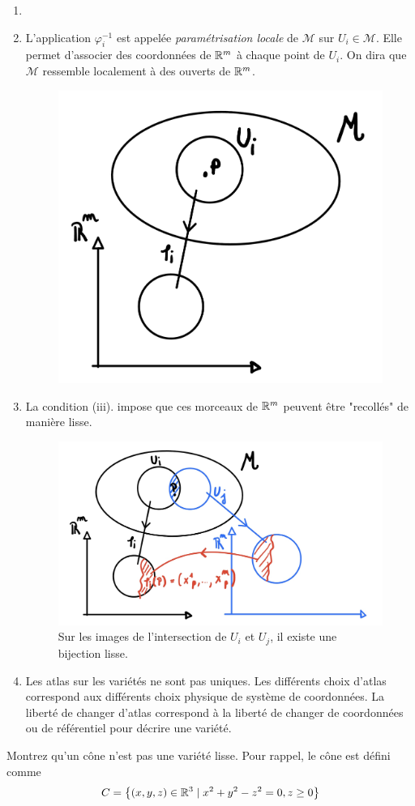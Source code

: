 \begin{rmk} 
    \begin{enumerate}
        \item[\,] 
        \item L'application $\varphi_i^{-1}$ est appelée \emph{paramétrisation locale} de $\mathcal{M}$ sur $U_i\in \mathcal{M}$. Elle permet d'associer des coordonnées de $\mathbb{R}^m$ à chaque point de $U_i$. On dira que $\mathcal{M}$ ressemble localement à des ouverts de $\mathbb{R}^m$.
        \begin{figure}[H]
            \centering
            \includegraphics[width=0.3\linewidth]{Chapitres/3.Element de géométrie différentielle/Images/variété.jpg}
            \caption{}
            \label{fig:3.1}
        \end{figure}
        \item La condition (iii). impose que ces morceaux de $\mathbb{R}^m$ peuvent être "recollés" de manière lisse.
        \begin{figure}[H]
            \centering
            \includegraphics[width=0.5\linewidth]{Chapitres/3.Element de géométrie différentielle/Images/ouvertchevauchement.jpg}
            \caption{Sur les images de l'intersection de $U_i$ et $U_j$, il existe une bijection lisse.}
            \label{fig:3.2}
        \end{figure}
        \item Les atlas sur les variétés ne sont pas uniques. Les différents choix d'atlas correspond aux différents choix physique de système de coordonnées. La liberté de changer d'atlas correspond à la liberté de changer de coordonnées ou de référentiel pour décrire une variété.
    \end{enumerate}
\end{rmk}
    \begin{exerc}
        Montrez qu'un cône n'est pas une variété lisse. Pour rappel, le cône est défini comme 
        \begin{equation}
            C = \left\{ (x,y,z)\in \mathbb{R}^3 \mid x^2+y^2-z^2=0, z\geq 0 \right\}
        \end{equation}
    \end{exerc}
